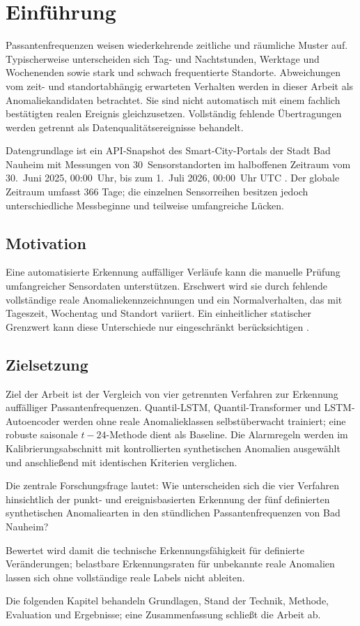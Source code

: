 \chapter{Einführung}
\label{ch:Einfuehrung}

Passantenfrequenzen weisen wiederkehrende zeitliche und räumliche Muster auf.
Typischerweise unterscheiden sich Tag- und Nachtstunden, Werktage und
Wochenenden sowie stark und schwach frequentierte Standorte. Abweichungen vom
zeit- und standortabhängig erwarteten Verhalten werden in dieser Arbeit als
Anomaliekandidaten betrachtet. Sie sind nicht automatisch mit einem fachlich
bestätigten realen Ereignis gleichzusetzen. Vollständig fehlende Übertragungen
werden getrennt als Datenqualitätsereignisse behandelt.

Datengrundlage ist ein API-Snapshot des Smart-City-Portals der Stadt Bad
Nauheim mit Messungen von 30~Sensorstandorten im halboffenen Zeitraum vom
30.~Juni 2025, 00:00~Uhr, bis zum 1.~Juli 2026, 00:00~Uhr UTC
\cite{badnauheim_pedestrian_2026}. Der globale Zeitraum umfasst 366 Tage; die
einzelnen Sensorreihen besitzen jedoch unterschiedliche Messbeginne und
teilweise umfangreiche Lücken.

\section{Motivation}
\label{sec:Einfuehrung_Motivation}

Eine automatisierte Erkennung auffälliger Verläufe kann die manuelle Prüfung
umfangreicher Sensordaten unterstützen. Erschwert wird sie durch fehlende
vollständige reale Anomaliekennzeichnungen und ein Normalverhalten, das mit
Tageszeit, Wochentag und Standort variiert. Ein einheitlicher statischer
Grenzwert kann diese Unterschiede nur eingeschränkt berücksichtigen
\cite{hundman2018spacecraft}.

\section{Zielsetzung}
\label{sec:Einfuehrung_Zielsetzung}

Ziel der Arbeit ist der Vergleich von vier getrennten Verfahren zur Erkennung
auffälliger Passantenfrequenzen. Quantil-LSTM, Quantil-Transformer und
LSTM-Autoencoder werden ohne reale Anomalieklassen selbstüberwacht trainiert;
eine robuste saisonale $t-24$-Methode dient als Baseline. Die Alarmregeln
werden im Kalibrierungsabschnitt mit kontrollierten synthetischen Anomalien
ausgewählt und anschließend mit identischen Kriterien verglichen.

Die zentrale Forschungsfrage lautet: Wie unterscheiden sich die vier Verfahren
hinsichtlich der punkt- und ereignisbasierten Erkennung der fünf definierten
synthetischen Anomaliearten in den stündlichen Passantenfrequenzen von Bad
Nauheim?

Bewertet wird damit die technische Erkennungsfähigkeit für definierte
Veränderungen; belastbare Erkennungsraten für unbekannte reale Anomalien lassen
sich ohne vollständige reale Labels nicht ableiten.

Die folgenden Kapitel behandeln Grundlagen, Stand der Technik, Methode,
Evaluation und Ergebnisse; eine Zusammenfassung schließt die Arbeit ab.
